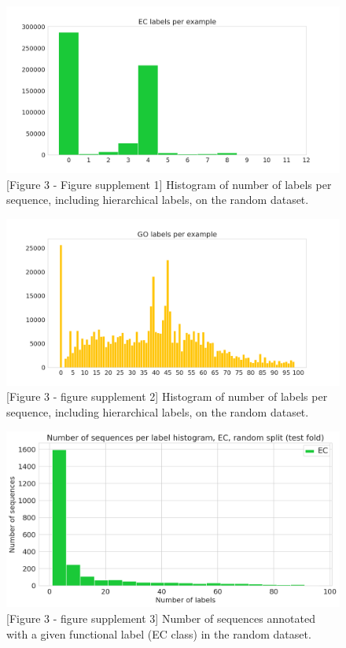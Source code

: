 \begin{figure}[htbp]
 
\centering
  \includegraphics[width=\textwidth]{ec_label_distribution.png}
  \caption{[Figure 3 - Figure supplement 1] Histogram of number of labels per sequence, including hierarchical labels, on the random dataset.}
\end{figure}
\begin{figure}[htbp]
  
\centering
  \includegraphics[width=\textwidth]{go_label_distribution.png}
  \caption{[Figure 3 - figure supplement 2] Histogram of number of labels per sequence, including hierarchical labels, on the random dataset.}
\end{figure}
\begin{figure}[htbp]
\centering
  \includegraphics[width=\textwidth]{sequences_per_label_ec_random.png}
  \caption{[Figure 3 - figure supplement 3] Number of sequences annotated with a given functional label (EC class) in the random dataset.}
\end{figure}
